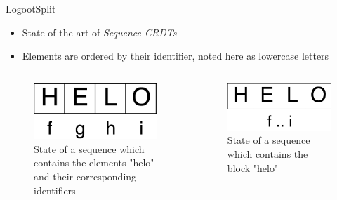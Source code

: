 \documentclass[10pt]{beamer}
\begin{document}
\begin{frame}{LogootSplit }
  \begin{itemize}
    \item State of the art of \emph{Sequence \acp{CRDT}}
    \item Elements are ordered by their identifier, noted here as lowercase letters
  \end{itemize}

  \pause

  \begin{columns}
    \begin{column}{0.5\textwidth}
      \begin{figure}
        \includegraphics[scale=0.15]{img/helo-as-letters.png}
        \caption{State of a sequence which contains the elements "helo" and their corresponding identifiers}
      \end{figure}
    \end{column}
    \pause
    \begin{column}{0.5\textwidth}
      \begin{figure}
        \includegraphics[scale=0.15]{img/helo-as-block.png}
        \caption{State of a sequence which contains the block "helo"}
      \end{figure}
    \end{column}
  \end{columns}
\end{frame}
\end{document}
